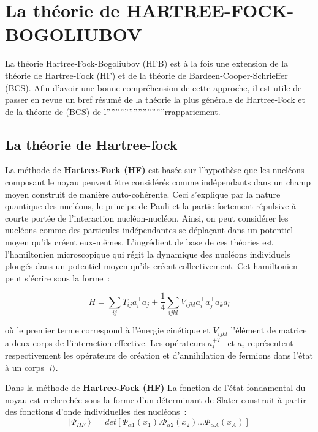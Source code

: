 

\chapter{  La théorie de HARTREE-FOCK-BOGOLIUBOV}

La théorie Hartree-Fock-Bogoliubov (HFB) est à la fois une extension de la théorie de Hartree-Fock (HF) et de la théorie de Bardeen-Cooper-Schrieffer (BCS). Afin d’avoir une bonne compréhension de cette approche, il est utile de passer en revue un bref résumé de la théorie la plus générale de Hartree-Fock et de la théorie de (BCS) de l''''''''''''''''''''''''''rrappariement.

\section{La théorie de Hartree-fock}

La méthode de \textbf{Hartree-Fock (HF)}  est basée sur l’hypothèse que les nucléons composant le noyau peuvent être considérés comme indépendants dans un champ moyen construit de manière auto-cohérente. Ceci s’explique par la nature quantique des nucléons, le principe de Pauli et la partie fortement répulsive à courte portée de l’interaction nucléon-nucléon. Ainsi, on peut considérer les nucléons comme des particules indépendantes se déplaçant dans un potentiel moyen qu’ils créent eux-mêmes. L’ingrédient de base de ces théories est l’hamiltonien microscopique qui régit la dynamique des nucléons individuels plongés dans un potentiel moyen qu’ils créent collectivement. Cet hamiltonien peut s’écrire sous la forme : 

\begin{equation}H=\sum _{\mathit{ij}} T_{\mathit{ij}} a_i^{+} a_j +\frac {1}{
4} \sum
_{\mathit{ijkl}}V_{\mathit{ijkl}}a_i^{+} a_j^{+}a_k a_l \end{equation}


où le premier terme correspond à l’énergie cinétique et $V_{\mathit{ijkl}}$  l’élément de matrice a deux corps de l’interaction effective. Les opérateurs $a_i^{+?}$ \textit{\ }et  $a_i$  représentent respectivement les opérateurs de création et d’annihilation de fermions dans l’état à un corps $|i\rangle$.

Dans la méthode de \textbf{Hartree-Fock (HF)}  La fonction de l’état fondamental du noyau est recherchée sous la forme d’un déterminant de Slater construit à partir des fonctions d'onde individuelles des nucléons : 
\begin{equation}|\left.\Psi _{\mathit{HF}}\right\rangle
=\mathit{det}\left[\Phi _{\mathit{\alpha 1}}\left(x_1\right).\Phi _{\mathit{\alpha 2}}\left(x_2\right){\dots}\Phi
_{\mathit{\alpha A}}\left(x_A\right)\right]\end{equation}


